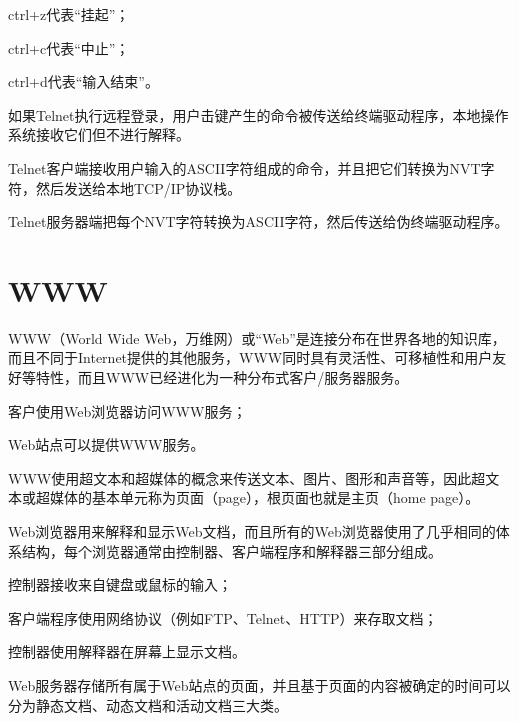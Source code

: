 \begin{compactitem}
\item ctrl+z代表“挂起”；
\item ctrl+c代表“中止”；
\item ctrl+d代表“输入结束”。
\end{compactitem}

如果Telnet执行远程登录，用户击键产生的命令被传送给终端驱动程序，本地操作系统接收它们但不进行解释。

\begin{compactitem}
\item Telnet客户端接收用户输入的ASCII字符组成的命令，并且把它们转换为NVT字符，然后发送给本地TCP/IP协议栈。
\item Telnet服务器端把每个NVT字符转换为ASCII字符，然后传送给伪终端驱动程序。
\end{compactitem}

\chapter{WWW}


WWW（World Wide Web，万维网）或“Web”是连接分布在世界各地的知识库，而且不同于Internet提供的其他服务，WWW同时具有灵活性、可移植性和用户友好等特性，而且WWW已经进化为一种分布式客户/服务器服务。

\begin{compactitem}
\item 客户使用Web浏览器访问WWW服务；
\item Web站点可以提供WWW服务。
\end{compactitem}

WWW使用超文本和超媒体的概念来传送文本、图片、图形和声音等，因此超文本或超媒体的基本单元称为页面（page），根页面也就是主页（home page）。

Web浏览器用来解释和显示Web文档，而且所有的Web浏览器使用了几乎相同的体系结构，每个浏览器通常由控制器、客户端程序和解释器三部分组成。

\begin{compactitem}
\item 控制器接收来自键盘或鼠标的输入；
\item 客户端程序使用网络协议（例如FTP、Telnet、HTTP）来存取文档；
\item 控制器使用解释器在屏幕上显示文档。
\end{compactitem}

Web服务器存储所有属于Web站点的页面，并且基于页面的内容被确定的时间可以分为静态文档、动态文档和活动文档三大类。


